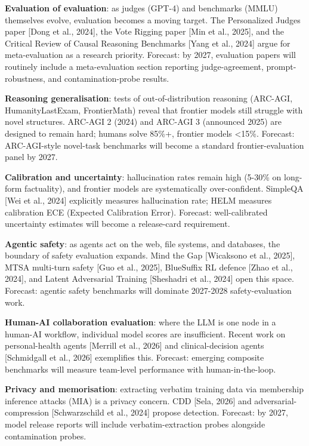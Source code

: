 \textbf{Evaluation of evaluation}: as judges (GPT-4) and benchmarks (MMLU) themselves evolve, evaluation becomes a moving target. The Personalized Judges paper {[}Dong et al., 2024{]}, the Vote Rigging paper {[}Min et al., 2025{]}, and the Critical Review of Causal Reasoning Benchmarks {[}Yang et al., 2024{]} argue for meta-evaluation as a research priority. Forecast: by 2027, evaluation papers will routinely include a meta-evaluation section reporting judge-agreement, prompt-robustness, and contamination-probe results.

\textbf{Reasoning generalisation}: tests of out-of-distribution reasoning (ARC-AGI, HumanityLastExam, FrontierMath) reveal that frontier models still struggle with novel structures. ARC-AGI 2 (2024) and ARC-AGI 3 (announced 2025) are designed to remain hard; humans solve 85\%+, frontier models \textless15\%. Forecast: ARC-AGI-style novel-task benchmarks will become a standard frontier-evaluation panel by 2027.

\textbf{Calibration and uncertainty}: hallucination rates remain high (5-30\% on long-form factuality), and frontier models are systematically over-confident. SimpleQA {[}Wei et al., 2024{]} explicitly measures hallucination rate; HELM measures calibration ECE (Expected Calibration Error). Forecast: well-calibrated uncertainty estimates will become a release-card requirement.

\textbf{Agentic safety}: as agents act on the web, file systems, and databases, the boundary of safety evaluation expands. Mind the Gap {[}Wicaksono et al., 2025{]}, MTSA multi-turn safety {[}Guo et al., 2025{]}, BlueSuffix RL defence {[}Zhao et al., 2024{]}, and Latent Adversarial Training {[}Sheshadri et al., 2024{]} open this space. Forecast: agentic safety benchmarks will dominate 2027-2028 safety-evaluation work.

\textbf{Human-AI collaboration evaluation}: where the LLM is one node in a human-AI workflow, individual model scores are insufficient. Recent work on personal-health agents {[}Merrill et al., 2026{]} and clinical-decision agents {[}Schmidgall et al., 2026{]} exemplifies this. Forecast: emerging composite benchmarks will measure team-level performance with human-in-the-loop.

\textbf{Privacy and memorisation}: extracting verbatim training data via membership inference attacks (MIA) is a privacy concern. CDD {[}Sela, 2026{]} and adversarial-compression {[}Schwarzschild et al., 2024{]} propose detection. Forecast: by 2027, model release reports will include verbatim-extraction probes alongside contamination probes.

